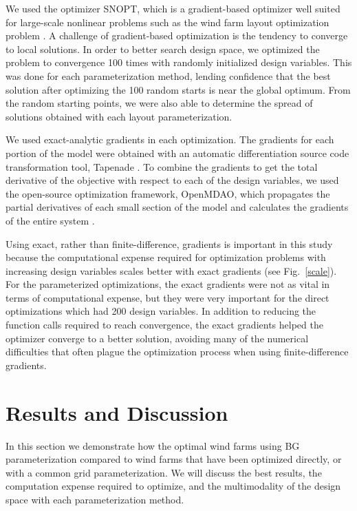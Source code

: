 \documentclass[wes, manuscript]{copernicus}
\begin{document}
We used the optimizer SNOPT, which is a gradient-based optimizer well suited for large-scale nonlinear problems such as the wind farm layout optimization problem \citep{gill2005snopt}. 
A challenge of gradient-based optimization is the tendency to converge to local solutions. In order to better search design space, we optimized the problem to convergence 100 times with randomly initialized design variables. This was done for each parameterization method, lending confidence that the best solution after optimizing the 100 random starts is near the global optimum. 
From the random starting points, we were also able to determine the spread of solutions obtained with each layout parameterization. 

We used exact-analytic gradients in each optimization. The gradients for each portion of the model were obtained with an automatic differentiation source code transformation tool, Tapenade \citep{hascoet2013tapenade}. To combine the gradients to get the total derivative of the objective with respect to each of the design variables, we used the open-source optimization framework, OpenMDAO, which propagates the partial derivatives of each small section of the model and calculates the gradients of the entire system \citep{gray2010openmdao}.

Using exact, rather than finite-difference, gradients is important in this study because the computational expense required for optimization problems with increasing design variables scales better with exact gradients (see Fig.~\ref{scale}). For the parameterized optimizations, the exact gradients were not as vital in terms of computational expense, but they were very important for the direct optimizations which had 200 design variables. In addition to reducing the function calls required to reach convergence, the exact gradients helped the optimizer converge to a better solution, avoiding many of the numerical difficulties that often plague the optimization process when using finite-difference gradients. 




\section{Results and Discussion}
In this section we demonstrate how the optimal wind farms using BG parameterization compared to wind farms that have been optimized directly, or with a common grid parameterization. We will discuss the best results, the computation expense required to optimize, and the multimodality of the design space with each parameterization method.
\end{document}
